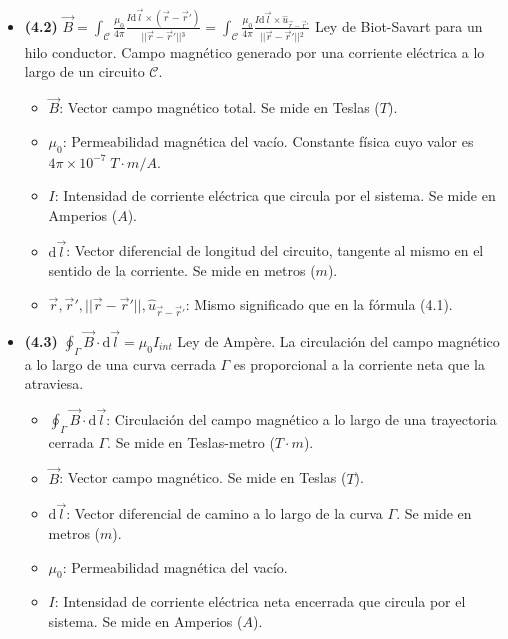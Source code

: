 \documentclass{article}
\begin{document}
\begin{itemize}
				\item \textbf{(4.2)} $\boxed{\vec{B} = \int_{\mathcal{C}} \frac{\mu_0}{4\pi} \frac{I\mathrm{d}\vec{l} \times (\vec{r} - \vec{r}')}{\vert{}\vert{}\vec{r} - \vec{r}'\vert{}\vert{}^3} = \int_{\mathcal{C}} \frac{\mu_0}{4\pi} \frac{I\mathrm{d}\vec{l} \times \hat{u}_{\vec{r}-\vec{r}'}}{\vert{}\vert{}\vec{r} - \vec{r}'\vert{}\vert{}^2}}$ Ley de Biot-Savart para un hilo conductor. Campo magnético generado por una corriente eléctrica a lo largo de un circuito $\mathcal{C}$.
					\begin{itemize}
						\item $\vec{B}$: Vector campo magnético total. Se mide en Teslas ($T$).
						\item $\mu_0$: Permeabilidad magnética del vacío. Constante física cuyo valor es $4 \pi \times 10^{-7} \; T \cdot m/A$.
						\item $I$: Intensidad de corriente eléctrica que circula por el sistema. Se mide en Amperios ($A$).
						\item $\mathrm{d}\vec{l}$: Vector diferencial de longitud del circuito, tangente al mismo en el sentido de la corriente. Se mide en metros ($m$).
						\item $\vec{r}, \vec{r}', \vert{}\vert{}\vec{r} - \vec{r}'\vert{}\vert{}, \hat{u}_{\vec{r}-\vec{r}'}$: Mismo significado que en la fórmula (4.1).
					\end{itemize}

				\item \textbf{(4.3)} $\boxed{\oint_{\Gamma} \vec{B} \cdot \mathrm{d}\vec{l} = \mu_0 I_{int}}$ Ley de Ampère. La circulación del campo magnético a lo largo de una curva cerrada $\Gamma$ es proporcional a la corriente neta que la atraviesa.
					\begin{itemize}
						\item $\oint_{\Gamma} \vec{B} \cdot \mathrm{d}\vec{l}$: Circulación del campo magnético a lo largo de una trayectoria cerrada $\Gamma$. Se mide en Teslas-metro ($T\cdot m$).
						\item $\vec{B}$: Vector campo magnético. Se mide en Teslas ($T$).
						\item $\mathrm{d}\vec{l}$: Vector diferencial de camino a lo largo de la curva $\Gamma$. Se mide en metros ($m$).
						\item $\mu_0$: Permeabilidad magnética del vacío.
						\item $I$: Intensidad de corriente eléctrica neta encerrada que circula por el sistema. Se mide en Amperios ($A$).
					\end{itemize}


\end{itemize}
\end{document}
